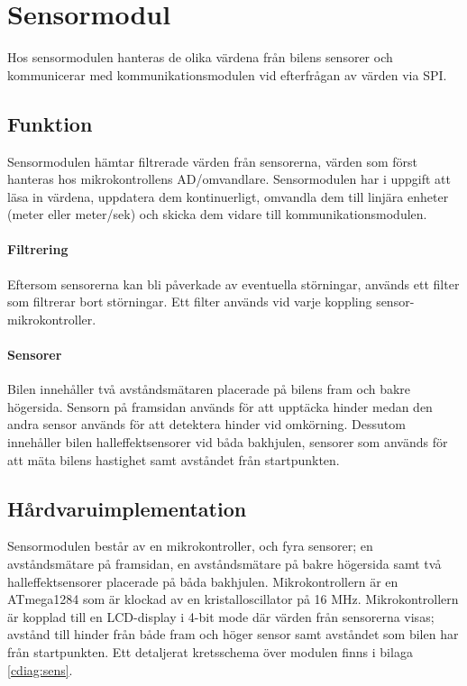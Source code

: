 \documentclass[tekniskrapport/tech.tex]{subfiles}
\begin{document}
\section{Sensormodul}
Hos sensormodulen hanteras de olika värdena från bilens sensorer och
kommunicerar med kommunikationsmodulen vid efterfrågan av värden via SPI.

\subsection{Funktion} Sensormodulen hämtar filtrerade värden från sensorerna,
värden som först hanteras hos mikrokontrollens AD/omvandlare. Sensormodulen
har i uppgift att läsa in värdena, uppdatera dem kontinuerligt, omvandla dem
till linjära enheter (meter eller meter/sek) och skicka dem vidare till
kommunikationsmodulen.

\paragraph{Filtrering} Eftersom sensorerna kan bli påverkade av eventuella
störningar, används ett filter som filtrerar bort störningar. Ett filter
används vid varje koppling sensor-mikrokontroller.

\paragraph{Sensorer} Bilen innehåller två avståndsmätaren placerade på bilens
fram och bakre högersida. Sensorn på framsidan används för att upptäcka hinder
medan den andra sensor används för att detektera hinder vid omkörning. Dessutom
innehåller bilen halleffektsensorer vid båda bakhjulen, sensorer som används
för att mäta bilens hastighet samt avståndet från startpunkten.

\subsection{Hårdvaruimplementation} Sensormodulen består av en mikrokontroller,
och fyra sensorer; en avståndsmätare på framsidan, en avståndsmätare på bakre
högersida samt två halleffektsensorer placerade på båda bakhjulen.
Mikrokontrollern är en ATmega1284 som är klockad av en kristalloscillator på 16
MHz. Mikrokontrollern är kopplad till en LCD-display i 4-bit mode där värden
från sensorerna visas; avstånd till hinder från både fram och höger sensor samt
avståndet som bilen har från startpunkten. Ett detaljerat kretsschema över
modulen finns i bilaga \ref{cdiag:sens}.
\end{document}
